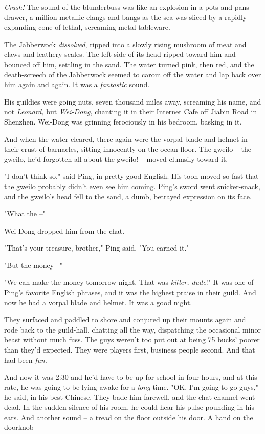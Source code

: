 \emph{Crash!} The sound of the blunderbuss was like an explosion in
a pots-and-pans drawer, a million metallic clangs and bangs as the
sea was sliced by a rapidly expanding cone of lethal, screaming
metal tableware.

The Jabberwock \emph{dissolved}, ripped into a slowly rising
mushroom of meat and claws and leathery scales. The left side of
its head ripped toward him and bounced off him, settling in the
sand. The water turned pink, then red, and the death-screech of the
Jabberwock seemed to carom off the water and lap back over him
again and again. It was a \emph{fantastic} sound.

His guildies were going nuts, seven thousand miles away, screaming
his name, and not \emph{Leonard,} but \emph{Wei-Dong}, chanting it
in their Internet Cafe off Jiabin Road in Shenzhen. Wei-Dong was
grinning ferociously in his bedroom, basking in it.

And when the water cleared, there again were the vorpal blade and
helmet in their crust of barnacles, sitting innocently on the ocean
floor. The gweilo -- the gweilo, he'd forgotten all about the
gweilo! -- moved clumsily toward it.

"I don't think so," said Ping, in pretty good English. His toon
moved so fast that the gweilo probably didn't even see him coming.
Ping's sword went snicker-snack, and the gweilo's head fell to the
sand, a dumb, betrayed expression on its face.

"What the --"

Wei-Dong dropped him from the chat.

"That's your treasure, brother," Ping said. "You earned it."

"But the money --"

"We can make the money tomorrow night. That was
\emph{killer, dude}!" It was one of Ping's favorite English
phrases, and it was the highest praise in their guild. And now he
had a vorpal blade and helmet. It was a good night.

They surfaced and paddled to shore and conjured up their mounts
again and rode back to the guild-hall, chatting all the way,
dispatching the occasional minor beast without much fuss. The guys
weren't too put out at being 75 bucks' poorer than they'd expected.
They were players first, business people second. And that had been
\emph{fun}.

And now it was 2:30 and he'd have to be up for school in four
hours, and at this rate, he was going to be lying awake for a
\emph{long} time. "OK, I'm going to go guys," he said, in his best
Chinese. They bade him farewell, and the chat channel went dead. In
the sudden silence of his room, he could hear his pulse pounding in
his ears. And another sound -- a tread on the floor outside his
door. A hand on the doorknob --

